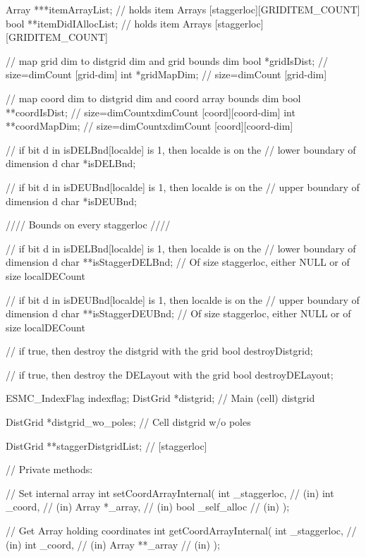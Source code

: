 {{   Array ***itemArrayList; // holds item Arrays [staggerloc][GRIDITEM_COUNT]
   bool   **itemDidIAllocList; // holds item Arrays [staggerloc][GRIDITEM_COUNT]
 
 
   // map grid dim to distgrid dim and grid bounds dim
   bool *gridIsDist;  // size=dimCount [grid-dim]
   int *gridMapDim;   // size=dimCount [grid-dim]
 
   // map coord dim to distgrid dim and coord array bounds dim
   bool **coordIsDist; // size=dimCountxdimCount [coord][coord-dim]
   int **coordMapDim; // size=dimCountxdimCount [coord][coord-dim]
 
   // if bit d in isDELBnd[localde] is 1, then localde is on the
   // lower boundary of dimension d
   char *isDELBnd;
  
  // if bit d in isDEUBnd[localde] is 1, then localde is on the
   // upper boundary of dimension d
   char *isDEUBnd;
 
 
   //// Bounds on every staggerloc ////
   
   // if bit d in isDELBnd[localde] is 1, then localde is on the
   // lower boundary of dimension d
   char **isStaggerDELBnd; // Of size staggerloc, either NULL or of size localDECount
 
  // if bit d in isDEUBnd[localde] is 1, then localde is on the
   // upper boundary of dimension d
   char **isStaggerDEUBnd; // Of size staggerloc, either NULL or of size localDECount
 
 
   // if true, then destroy the distgrid with the grid
   bool destroyDistgrid;
 
   // if true, then destroy the DELayout with the grid
   bool destroyDELayout;
 
 
   ESMC_IndexFlag indexflag;
   DistGrid *distgrid; // Main (cell) distgrid
 
   DistGrid *distgrid_wo_poles; // Cell distgrid w/o poles
 
 
   DistGrid **staggerDistgridList; // [staggerloc]
 
   // Private methods:
 
   // Set internal array
   int setCoordArrayInternal(
             int _staggerloc, // (in)
             int _coord,      // (in)
             Array *_array,   // (in)
             bool _self_alloc // (in)
             );
 
   // Get Array holding coordinates
  int getCoordArrayInternal(
             int _staggerloc, // (in)
             int _coord,      // (in)
             Array **_array   // (in)
             );
 
}}
